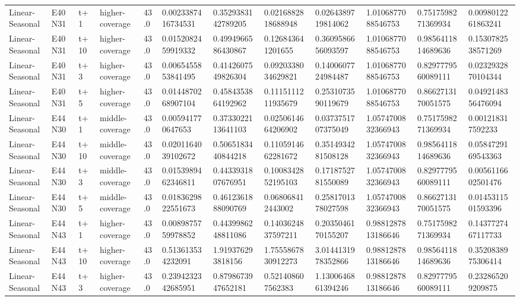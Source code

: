 \begin{landscape}
\begin{longtable}{llllllllllll}
Linear-Seasonal & E40N31 & t+1 & higher-coverage & 43.0 & 0.0023387416734531 & 0.3529383142789205 & 0.0216882818688948 & 0.0264389719814062 & 1.0106877088546753 & 0.7517598271369934 & 0.0098012261863241 \\
Linear-Seasonal & E40N31 & t+10 & higher-coverage & 43.0 & 0.0152082459919332 & 0.4994966586430867 & 0.126843641201655 & 0.3609586656093597 & 1.0106877088546753 & 0.9856411814689636 & 0.1530782538571269 \\
Linear-Seasonal & E40N31 & t+3 & higher-coverage & 43.0 & 0.0065455853841495 & 0.4142607549826304 & 0.0920338034629821 & 0.1400607724984487 & 1.0106877088546753 & 0.8297779560089111 & 0.0232932870104344 \\
Linear-Seasonal & E40N31 & t+5 & higher-coverage & 43.0 & 0.0144870268907104 & 0.4584353864192962 & 0.1115111211935679 & 0.2531073590119679 & 1.0106877088546753 & 0.8662713170051575 & 0.0492148356476094 \\
Linear-Seasonal & E44N30 & t+1 & middle-coverage & 43.0 & 0.005941770647653 & 0.3733022113641103 & 0.0250614664206902 & 0.0373751707375049 & 1.0574700832366943 & 0.7517598271369934 & 0.001218317592233 \\
Linear-Seasonal & E44N30 & t+10 & middle-coverage & 43.0 & 0.0201164039102672 & 0.5065183440844218 & 0.1105914662281672 & 0.3514934281508128 & 1.0574700832366943 & 0.9856411814689636 & 0.0584729169543363 \\
Linear-Seasonal & E44N30 & t+3 & middle-coverage & 43.0 & 0.0153989462346811 & 0.4433931807676951 & 0.1008342852195103 & 0.1718752781550089 & 1.0574700832366943 & 0.8297779560089111 & 0.0056116602501476 \\
Linear-Seasonal & E44N30 & t+5 & middle-coverage & 43.0 & 0.0183629822551673 & 0.4612361888090769 & 0.068068412443002 & 0.2581701378027598 & 1.0574700832366943 & 0.8662713170051575 & 0.0145311501593396 \\
Linear-Seasonal & E44N43 & t+1 & higher-coverage & 43.0 & 0.0089875759978852 & 0.4439986248811086 & 0.1403624837597211 & 0.2035046170155207 & 0.9881287813186646 & 0.7517598271369934 & 0.1437727467117733 \\
Linear-Seasonal & E44N43 & t+10 & higher-coverage & 43.0 & 0.513613534232091 & 1.919376293818156 & 1.7555867830912273 & 3.0144131978352866 & 0.9881287813186646 & 0.9856411814689636 & 0.3520838975306414 \\
Linear-Seasonal & E44N43 & t+3 & higher-coverage & 43.0 & 0.2394232342685951 & 0.8798673947652181 & 0.521408607562383 & 1.1300646861394246 & 0.9881287813186646 & 0.8297779560089111 & 0.232865209209875 \\

\end{longtable}
\end{landscape}
